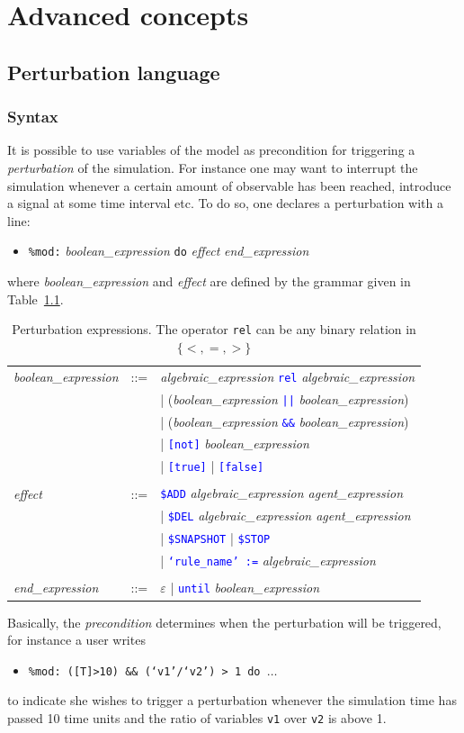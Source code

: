 \documentclass[11pt]{book}
\def\tcb#1{\textcolor{blue}{\ttt{#1}}}
\def\ttt#1{\texttt{#1}}
\def\set#1{\{#1\}}
\def\ITE#1{\begin{itemize}#1\end{itemize}}
\begin{document}
\chapter{Advanced concepts}\label{chap:advanced}

\section{Perturbation language}\label{sec:mod}

\subsection{Syntax} 
It is possible to use variables of the model as precondition for triggering a \emph{perturbation} of the simulation. For instance one may want to interrupt the simulation whenever a certain amount of observable has been reached, introduce a signal at some time interval etc. To do so, one declares a perturbation with a line:
\ITE{
\item[] \ttt{\%mod:} \textit{boolean\_expression} \ttt{do} \textit{effect} \textit{end\_expression}
}
where \textit{boolean\_expression} and \textit{effect} are defined by the grammar given in Table~\ref{tab:pert}.
\begin{table}[htbp]
  \centering
  \begin{tabular}{@{} lcl @{}}
    \textit{boolean\_expression} &::=& \textit{algebraic\_expression} \tcb{rel} \textit{algebraic\_expression} \\
    && | (\textit{boolean\_expression} \tcb{||} \textit{boolean\_expression}) \\
    && | (\textit{boolean\_expression} \tcb{\&\&} \textit{boolean\_expression}) \\
    && | \tcb{[not]} \textit{boolean\_expression} \\
    && | \tcb{[true]} | \tcb{[false]} \\\\
    \textit{effect} &::=& \tcb{\$ADD} \textit{algebraic\_expression agent\_expression} \\
    && | \tcb{\$DEL} \textit{algebraic\_expression agent\_expression} \\
    && | \tcb{\$SNAPSHOT} | \tcb{\$STOP} \\ && | \tcb{`rule\_name' :=} \textit{algebraic\_expression} \\\\
    \textit{end\_expression} &::=& $\varepsilon$ | \tcb{until} \textit{boolean\_expression}
    \end{tabular}
  \caption{Perturbation expressions. The operator \ttt{rel} can be any binary relation in $\set{<,=,>}$ }
  \label{tab:pert}
\end{table}
Basically, the \textit{precondition} determines when the perturbation will be triggered, for instance a user writes
\ITE{
\item[] \ttt{\%mod: ([T]>10) \&\& (`v1'/`v2') > 1 do $\dots$}
}
to indicate she wishes to trigger a perturbation whenever the simulation time has passed 10 time units and the ratio of variables \ttt{v1} over \ttt{v2} is above 1.
\end{document}
